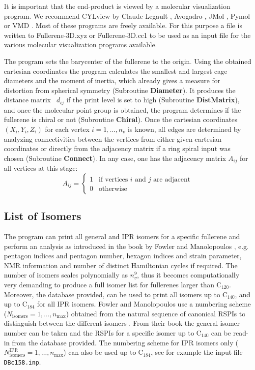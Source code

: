 \documentclass[article,a4paper,twoside]{memoir}
\newcommand{\C}[1]{\ensuremath{\mathrm{C}_{#1}}}
\newcommand{\filename}[1]{\texttt{#1}}
\newcommand{\funname}[1]{{\color{blue}\textbf{#1}}}
\begin{document}
It is important that the end-product is viewed by a molecular visualization program. 
We recommend CYLview by Claude Legault \cite{CYLview}, Avogadro \cite{Avogadro}, JMol \cite{JMol}, Pymol \cite{Pymol} or VMD \cite{vmd}. 
Most of these programs are freely available.  For this purpose a file is written to Fullerene-3D.xyz or Fullerene-3D.cc1 to be used as an input file 
for the various molecular visualization programs available.

The program sets the barycenter of the fullerene 
to the origin. Using the obtained cartesian coordinates the program calculates the smallest and largest cage diameters and the
moment of inertia, which already gives a measure for distortion from spherical symmetry (Subroutine \funname{Diameter}). 
It produces the distance matrix~ $d_{ij}$ if the print level is set to high (Subroutine \funname{DistMatrix}), and once the 
molecular point group is obtained, the program determines if the fullerene is chiral or not (Subroutine \funname{Chiral}).
Once the cartesian coordinates $(X_i, Y_i, Z_i)$ for each vertex $i=1,\dots, n_v$ is known, all edges are determined by 
analyzing connectivities between the vertices from either given cartesian coordinates or directly from the adjacency matrix 
if a ring spiral input was chosen (Subroutine \funname{Connect}). In any case, one has the adjacency matrix $A_{ij}$ for all vertices at this stage:
\begin{equation}
  \label{eq:adjacencymatrix}
  A_{ij} =
  \begin{cases}
    1 & \text{if vertices $i$ and $j$ are adjacent}\\
    0 & \text{otherwise}
  \end{cases}
\end{equation}

\subsection{List of Isomers}
The program can print all general and IPR isomers for a specific fullerene and perform an analysis as introduced 
in the book by Fowler and Manolopoulos \cite{Atlas}, e.g. pentagon indices and 
pentagon number, hexagon indices and strain parameter, NMR information and number of distinct Hamiltonian cycles if 
required. The number of isomers scales polynomially as $n_v^9$, thus it becomes computationally
very demanding to produce a full isomer list for fullerenes larger than \C{120}. Moreover, the database provided, can be used to print all isomers up to 
\C{140}, and up to \C{184} for all IPR isomers. Fowler and Manolopoulos use a numbering scheme ($N_\mathrm{isomers}= 1,\dots, n_\mathrm{max}$) 
obtained from the natural sequence of canonical RSPIs to distinguish between the different isomers \cite{Atlas}. From their book \cite{Atlas} the
general isomer number can be taken and the RSPIs for a specific isomer up to \C{140} can be read-in from the database provided. 
The numbering scheme for IPR isomers only ($N_\mathrm{isomers}^\mathrm{IPR}= 1,\dots, n_\mathrm{max}$) can also be used up to \C{184}, 
see for example the input file \filename{DBc158.inp}.
\end{document}

